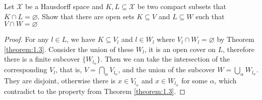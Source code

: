 \documentclass[./main.tex]{subfiles}
\begin{document}
\begin{theorem}
  Let $\mathcal{X}$ be a Hausdorff space and $K, L \subseteq \mathcal{X}$ be
  two compact subsets that $K \cap L = \varnothing$.
  Show that there are open sets $K \subseteq V$ and $L \subseteq W$ such that
  $V \cap W = \varnothing$
\end{theorem}
\begin{proof}
  For any $l \in L$, we have $K \subseteq V_l$ and $l \in W_l$ where
  $V_l \cap W_l = \varnothing$ by Theorem \ref{theorem:1.3}.
  Consider the union of these $W_l$, it is an open cover on $L$, therefore there is
  a finite subcover $\{ W_{l_\alpha} \}$. Then we can take the intersection of
  the corresponding $V_l$, that is, $V = \bigcap_\alpha V_{l_\alpha}$,
  and the union of the subcover $W = \bigcup_\alpha W_{l_\alpha}$.
  They are disjoint, otherwise there is $x \in V_{l_\alpha}$ and $x \in W_{l_\alpha}$ for some $\alpha$,
  which contradict to the property from Theorem \ref{theorem:1.3}.
\end{proof}
\end{document}
